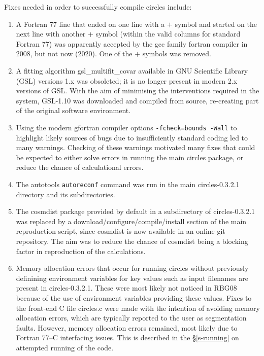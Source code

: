 Fixes needed in order to successfully compile {\sc circles} include:
\begin{enumerate}
\item
  A Fortran 77 line that ended on one line with a $+$ symbol and
  started on the next line with another $+$ symbol (within the valid
  columns for standard Fortran 77) was apparently accepted by the {\sc
    gcc} family fortran compiler in 2008, but not now (2020). One of
  the $+$ symbols was removed.
\item
  A fitting algorithm {\sc gsl\_multifit\_covar} available in GNU
  Scientific Library ({\sc GSL}) versions 1.x was obsoleted; it is no
  longer present in modern 2.x versions of {\sc GSL}. With the aim of
  minimising the interventions required in the system, {\sc
    GSL-1.10} was downloaded and compiled from source, re-creating
  part of the original software environment.
\item
  Using the modern {\sc gfortran} compiler options {\tt -fcheck=bounds
    -Wall} to highlight likely sources of bugs due to insufficiently
  standard coding led to many warnings.  Checking of these warnings
  motivated many fixes that could be expected to either solve errors
  in running the main {\sc circles} package, or reduce the chance of
  calculational errors.
\item
  The autotools {\tt autoreconf} command was run in the main {\sc
    circles-0.3.2.1} directory and its subdirectories.
\item
  The {\sc cosmdist} package provided by default in a subdirectory of
  {\sc circles-0.3.2.1} was replaced by a
  download/configure/compile/install section of the main reproduction
  script, since {\sc cosmdist} is now available in an online
  git repository. The aim was to reduce the chance of {\sc cosmdist}
  being a blocking factor in reproduction of the calculations.
\item
  Memory allocation errors that occur for running {\sc circles}
  without previously definining environment variables for key
  values such as input filenames are present in {\sc
    circles-0.3.2.1}. These were most likely not noticed in RBG08
  because of the use of environment variables providing these
  values. Fixes to the front-end C file {\sc circles.c} were
  made with the intention of avoiding memory allocation errors,
  which are typically reported to the user as segmentation faults.
  However, memory allocation errors remained, most likely due
  to Fortran 77--C interfacing issues. This is described in the
  \S\ref{s-running} on attempted running of the code.
\end{enumerate}

